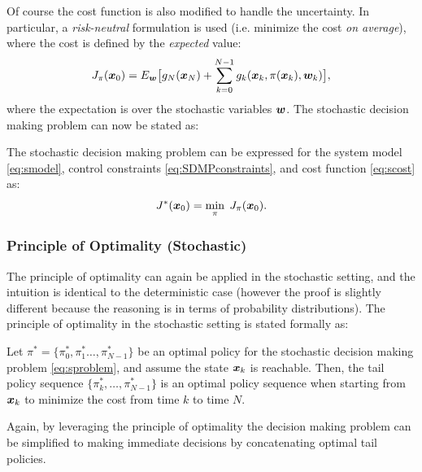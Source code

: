 Of course the cost function is also modified to handle the uncertainty. In particular, a \textit{risk-neutral} formulation is used (i.e. minimize the cost \textit{on average}), where the cost is defined by the \textit{expected} value:
\begin{equation} \label{eq:scost}
J_\pi(\bm{x}_0) = E_{\bm{w}} \big[g_N(\bm{x}_N) + \sum_{k=0}^{N-1} g_k(\bm{x}_k, \pi(\bm{x}_k), \bm{w}_k)\big],
\end{equation}
where the expectation is over the stochastic variables $\bm{w}$. The stochastic decision making problem can now be stated as:
\begin{definition}
The stochastic decision making problem can be expressed for the system model \eqref{eq:smodel}, control constraints \eqref{eq:SDMPconstraints}, and cost function \eqref{eq:scost} as:
\begin{equation} \label{eq:sproblem}
J^*(\bm{x}_0) = \underset{\pi}{\min} \:\:J_{\pi}(\bm{x}_0).
\end{equation}
\end{definition}


\subsubsection{Principle of Optimality (Stochastic)}
The principle of optimality can again be applied in the stochastic setting, and the intuition is identical to the deterministic case (however the proof is slightly different because the reasoning is in terms of probability distributions). The principle of optimality in the stochastic setting is stated formally as:
\begin{theorem}
Let $\pi^* = \{\pi_0^*, \pi_1^* \dots, \pi_{N-1}^*\}$ be an optimal policy for the stochastic decision making problem \eqref{eq:sproblem}, and assume the state $\bm{x}_k$ is reachable. Then, the tail policy sequence $\{\pi_k^*, \dots, \pi_{N-1}^*\}$ is an optimal policy sequence when starting from $\bm{x}_k$ to minimize the cost from time $k$ to time $N$.
\end{theorem}
Again, by leveraging the principle of optimality the decision making problem can be simplified to making immediate decisions by concatenating optimal tail policies.

